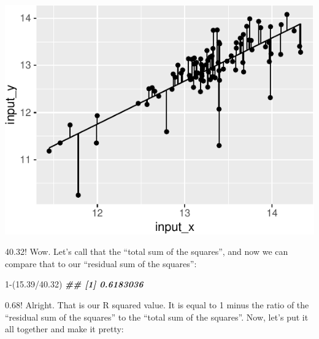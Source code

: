 \documentclass[
]{krantz}
\newenvironment{Shaded}{\begin{snugshade}}{\end{snugshade}}
\newcommand{\DecValTok}[1]{\textcolor[rgb]{0.00,0.00,0.81}{#1}}
\newcommand{\DocumentationTok}[1]{\textcolor[rgb]{0.56,0.35,0.01}{\textbf{\textit{#1}}}}
\newcommand{\FloatTok}[1]{\textcolor[rgb]{0.00,0.00,0.81}{#1}}
\newcommand{\NormalTok}[1]{#1}
\newcommand{\SpecialCharTok}[1]{\textcolor[rgb]{0.00,0.00,0.00}{#1}}
\begin{document}
\begin{center}\includegraphics{index_files/figure-latex/unnamed-chunk-127-1} \end{center}

40.32! Wow. Let's call that the ``total sum of the squares'', and now we can compare that to our ``residual sum of the squares'':

\begin{Shaded}
\begin{Highlighting}[]
\DecValTok{1}\SpecialCharTok{{-}}\NormalTok{(}\FloatTok{15.39}\SpecialCharTok{/}\FloatTok{40.32}\NormalTok{)}
\DocumentationTok{\#\# [1] 0.6183036}
\end{Highlighting}
\end{Shaded}

0.68! Alright. That is our R squared value. It is equal to 1 minus the ratio of the ``residual sum of the squares'' to the ``total sum of the squares''. Now, let's put it all together and make it pretty:
\end{document}

